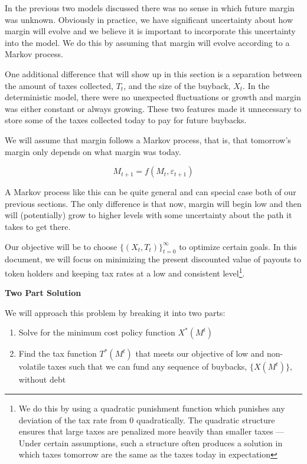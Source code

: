 
In the previous two models discussed there was no sense in which future margin was unknown.
Obviously in practice, we have significant uncertainty about how margin will evolve and we believe
it is important to incorporate this uncertainty into the model. We do this by assuming that margin
will evolve according to a Markov process.

One additional difference that will show up in this section is a separation between the amount of
taxes collected, $T_t$, and the size of the buyback, $X_t$. In the deterministic model, there were
no unexpected fluctuations or growth and margin was either constant or always growing. These two
features made it unnecessary to store some of the taxes collected today to pay for future buybacks.

We will assume that margin follows a Markov process, that is, that tomorrow's margin only depends on
what margin was today.

$$M_{t+1} = f(M_t, \varepsilon_{t+1})$$

A Markov process like this can be quite general and can special case both of our previous sections.
The only difference is that now, margin will begin low and then will (potentially) grow to higher
levels with some uncertainty about the path it takes to get there.

Our objective will be to choose $\{(X_t, T_t)\}_{t=0}^{\infty}$ to optimize certain goals. In this
document, we will focus on minimizing the present discounted value of payouts to token holders and
keeping tax rates at a low and consistent level\footnote{We do this by using a quadratic punishment
function which punishes any deviation of the tax rate from 0 quadratically. The quadratic structure
ensures that large taxes are penalized more heavily than smaller taxes --- Under certain
assumptions, such a structure often produces a solution in which taxes tomorrow are the same as the
taxes today in expectation}.

\textbf{Two Part Solution}

We will approach this problem by breaking it into two parts:

\begin{enumerate}
  \item Solve for the minimum cost policy function $X^*(M^t)$
  \item Find the tax function $T^*(M^t)$ that meets our objective of low and non-volatile taxes such
        that we can fund any sequence of buybacks, $\{X(M^t)\}$, without debt
\end{enumerate}


